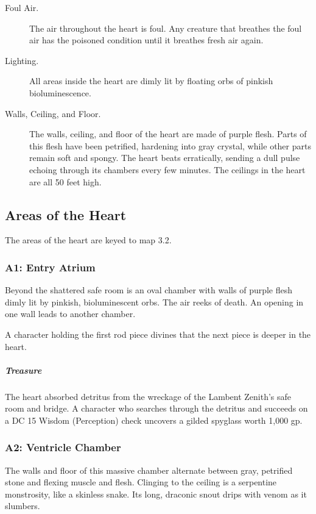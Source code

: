\documentclass[10pt,a4paper,twoside,bg=print,twocolumn,openany,nodeprecatedcode]{dndbook}
\begin{document}
\begin{description}
\item[Foul Air.]
The air throughout the heart is foul. Any creature that breathes the foul air has the poisoned condition until it breathes fresh air again.
\item[Lighting.]
All areas inside the heart are dimly lit by floating orbs of pinkish bioluminescence.
\item[Walls, Ceiling, and Floor.]
The walls, ceiling, and floor of the heart are made of purple flesh. Parts of this flesh have been petrified, hardening into gray crystal, while other parts remain soft and spongy. The heart beats erratically, sending a dull pulse echoing through its chambers every few minutes. The ceilings in the heart are all 50 feet high.
\end{description}

\subsection{Areas of the Heart}
The areas of the heart are keyed to map 3.2.

\subsubsection{A1: Entry Atrium}
\begin{DndReadAloud}{}
Beyond the shattered safe room is an oval chamber with walls of purple flesh dimly lit by pinkish, bioluminescent orbs. The air reeks of death. An opening in one wall leads to another chamber.

\end{DndReadAloud}

A character holding the first rod piece divines that the next piece is deeper in the heart.

\subparagraph{Treasure}
The heart absorbed detritus from the wreckage of the Lambent Zenith's safe room and bridge. A character who searches through the detritus and succeeds on a DC 15 Wisdom (Perception) check uncovers a gilded spyglass worth 1,000 gp.

\subsubsection{A2: Ventricle Chamber}
\begin{DndReadAloud}{}
The walls and floor of this massive chamber alternate between gray, petrified stone and flexing muscle and flesh. Clinging to the ceiling is a serpentine monstrosity, like a skinless snake. Its long, draconic snout drips with venom as it slumbers.

\end{DndReadAloud}
\end{document}
